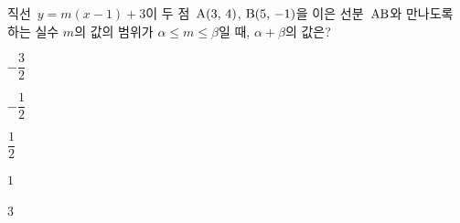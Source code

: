직선~$y=m(x-1)+3$이 두 점~$\mathrm{A}(3,\,4)$, $\mathrm{B}(5,\,-1)$을 이은 선분~$\mathrm{AB}$와 만나도록 하는 실수 $m$의 값의 범위가 $\alpha\le m\le\beta$일 때, $\alpha+\beta$의 값은?
\begin{choices32}{\rule[-3ex]{0pt}{8ex}$-\dfrac{3}{2}$}{\rule[-3ex]{0pt}{8ex}$-\dfrac{1}{2}$}{\rule[-3ex]{0pt}{8ex}$\dfrac{1}{2}$}{\rule[-3ex]{0pt}{8ex}$1$}{\rule[-3ex]{0pt}{8ex}$3$}\end{choices32}
